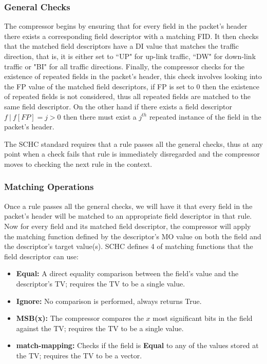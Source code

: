 \documentclass[12pt]{dalthesis}
\begin{document}
	\subsubsection{General Checks}
	The compressor begins by ensuring that for every field in the packet's header there exists a corresponding field descriptor with a matching FID.
	It then checks that the matched field descriptors have a DI value that matches the traffic direction, that is, it is 
	either set to ``UP" for up-link traffic, ``DW" for down-link traffic or "BI"
	for all traffic directions. Finally, the compressor checks for the existence of repeated fields in the packet's header, this check
	involves looking into the FP value of the matched field descriptors, if FP is set to 0 then the existence of repeated fields is not
	considered, thus all repeated fields are matched to the same field descriptor. On the other hand if there exists a field descriptor
	$f\ | \ f[FP] = j >0$ then there must exist a $j^{th}$ repeated instance of the field in the packet's header.

	The SCHC standard requires that a rule passes all the general checks, thus at any point when a check fails that rule is immediately
	disregarded and the compressor moves to checking the next rule in the context.

	\subsubsection{Matching Operations}
	Once a rule passes all the general checks, we will have it that every field in the packet's header will be matched to an appropriate
	field descriptor in that rule. Now for every field and its matched field descriptor, the compressor will apply the matching function
	defined by the descriptor's MO value on both the field and the descriptor's target value(s). SCHC defines 4 of matching functions
	that the field descriptor can use:
	
	\begin{itemize}
		\item \textbf{Equal:} A direct equality comparison between the field's value and the descriptor's TV; requires the TV to be a single value.
		\item \textbf{Ignore:} No comparison is performed, always returns True.
		\item \textbf{MSB(x):} The compressor compares the $x$ most significant bits in the field against the TV; requires the TV to be a single value.
		\item \textbf{match-mapping:} Checks if the field is \textbf{Equal} to any of the values stored at the TV; requires the TV to be a vector.
	\end{itemize}
	
\end{document}
